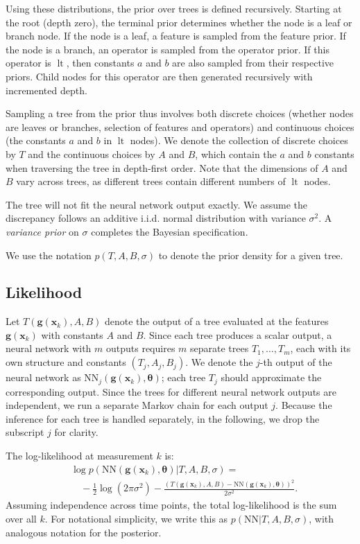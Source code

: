 \documentclass{ifacconf}
\DeclareMathOperator{\lt}{lt}
\begin{document}
	Using these distributions, the prior over trees is defined recursively.
	Starting at the root (depth zero), the terminal prior determines whether the node is a leaf or branch node.
	If the node is a leaf, a feature is sampled from the feature prior.
	If the node is a branch, an operator is sampled from the operator prior.
	If this operator is $\lt$, then constants $a$ and $b$ are also sampled from their respective priors.
	Child nodes for this operator are then generated recursively with incremented depth.
	
	Sampling a tree from the prior thus involves both discrete choices (whether nodes are leaves or branches, selection of features and operators) and continuous choices (the constants $a$ and $b$ in $\lt$ nodes).
	We denote the collection of discrete choices by $T$ and the continuous choices by $A$ and $B$, which contain the $a$ and $b$ constants when traversing the tree in depth-first order.
	Note that the dimensions of $A$ and $B$ vary across trees, as different trees contain different numbers of $\lt$ nodes.
	
	The tree will not fit the neural network output exactly.
	We assume the discrepancy follows an additive i.i.d. normal distribution with variance $\sigma^2$.
	A \textit{variance prior} on $\sigma$ completes the Bayesian specification.
	
	We use the notation $p(T, A, B, \sigma)$ to denote the prior density for a given tree.
	\subsection{Likelihood}
	Let $T(\bm g(\bm x_k), A, B)$ denote the output of a tree evaluated at the features $\bm g(\bm x_k)$ with constants $A$ and $B$.
	Since each tree produces a scalar output, a neural network with $m$ outputs requires $m$ separate trees $T_1, \ldots, T_m$, each with its own structure and constants $(T_j, A_j, B_j)$.
	We denote the $j$-th output of the neural network as $\text{NN}_j(\bm g(\bm x_k), \bm \theta)$; each tree $T_j$ should approximate the corresponding output.
	Since the trees for different neural network outputs are independent, we run a separate Markov chain for each output $j$.
	Because the inference for each tree is handled separately, in the following, we drop the subscript $j$ for clarity.
	
	The log-likelihood at measurement $k$ is:
	\begin{equation}\label{eq:likelihood}
		\begin{aligned}
			&\log p(\text{NN}(\bm g(\bm x_k), \bm \theta) | T, A, B, \sigma) =\\
			&\quad -\frac{1}{2}\log(2\pi\sigma^2) -\frac{\left( T(\bm g(\bm x_k), A, B) - \text{NN}(\bm g(\bm x_k), \bm \theta) \right)^2}{2\sigma^2}.
		\end{aligned}
	\end{equation}
	Assuming independence across time points, the total log-likelihood is the sum over all $k$.
	For notational simplicity, we write this as $p(\text{NN} | T, A, B, \sigma)$, with analogous notation for the posterior.
\end{document}
